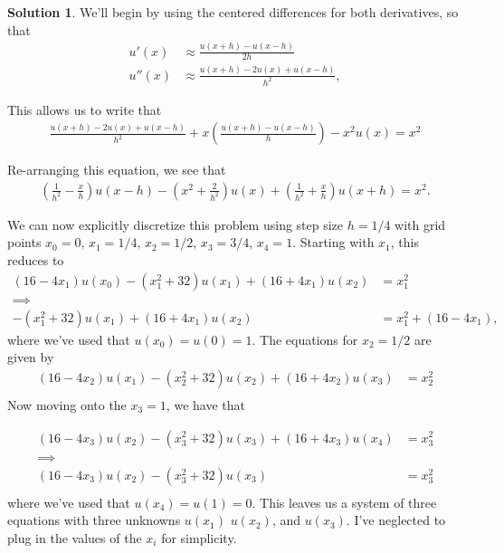 \documentclass[12pt]{article}
\theoremstyle{definition}
\newtheorem{sol}{Solution}
\theoremstyle{remark}
\begin{document}
\begin{sol}
    We'll begin by using the centered differences for both derivatives, so that
    \begin{align*}
        u'(x) &\approx \frac{u(x+h) - u(x-h)}{2h}\\
        u''(x) &\approx \frac{u(x+h) - 2 u(x) + u(x-h)}{h^{2}},
    \end{align*}

    This allows us to write that 
    \begin{align*}
        \frac{u(x+h) - 2 u(x) + u(x-h)}{h^{2}} + x \left(\frac{u(x+h) - u(x-h)}{h} \right) - x^{2}u(x) = x^{2}
    \end{align*}

    Re-arranging this equation, we see that
\begin{align*}
    \left( \frac{1}{h^{2}} - \frac{x}{h}\right) u(x-h) - \left(x^{2} + \frac{2}{h^{2}}\right)u(x) + \left(\frac{1}{h^{2}} + \frac{x}{h}\right) u(x+h) = x^{2}.
\end{align*}

We can now explicitly discretize this problem using step size $h = 1 / 4$ with grid points $x_0 = 0$, $x_1 = 1 / 4$, $x_2 = 1 / 2$, $x_3 = 3 / 4$, $x_4 = 1$. Starting with $x_{1}$, this reduces to
\begin{align*}
    (16 - 4 x_{1}) u(x_{0}) - (x_{1}^{2} + 32) u(x_{1}) + (16 + 4 x_{1}) u(x_{2}) &= x_{1}^{2}\\
                    \implies \quad \quad \quad \\
                             - (x_{1}^{2} + 32) u(x_{1}) + (16 + 4 x_{1}) u(x_{2}) &= x_{1}^{2} + (16 - 4x_{1}),
\end{align*}
where we've used that $u(x_{0}) = u(0) = 1$. The equations for $x_{2} = 1 / 2$ are given by
\begin{align*}
    (16 - 4 x_{2}) u(x_{1}) - (x_{2}^{2} + 32) u(x_{2}) + (16 + 4 x_{2}) u(x_{3}) &= x_{2}^{2}\\
\end{align*}
Now moving onto the $x_{3} = 1$, we have that

\begin{align*}
    (16 - 4 x_{3}) u(x_{2}) - (x_{3}^{2} + 32) u(x_{3}) + (16 + 4 x_{3}) u(x_{4}) &= x_{3}^{2}\\
                    \implies \quad \quad \quad \\
    (16 - 4 x_{3}) u(x_{2}) - (x_{3}^{2} + 32) u(x_{3})  &= x_{3}^{2}\\
\end{align*}
where we've used that $u(x_{4}) = u(1) = 0$. This leaves us a system of three equations with three unknowns $u(x_{1})$ $u(x_{2})$, and $u(x_{3})$. I've neglected to plug in the values of the $x_{i}$ for simplicity.
\end{sol}
\newpage
\end{document}
